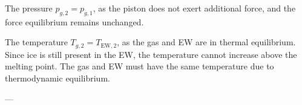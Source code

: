 The pressure \( p_{g,2} = p_{g,1} \), as the piston does not exert additional force, and the force equilibrium remains unchanged.  

The temperature \( T_{g,2} = T_{\text{EW},2} \), as the gas and EW are in thermal equilibrium. Since ice is still present in the EW, the temperature cannot increase above the melting point. The gas and EW must have the same temperature due to thermodynamic equilibrium.

---